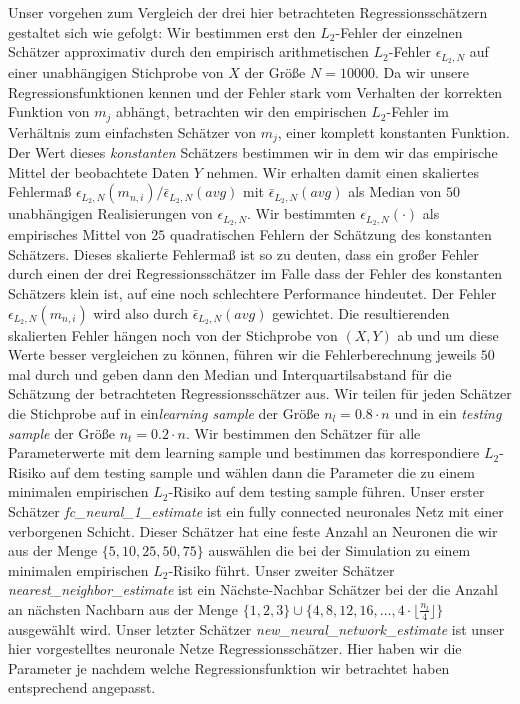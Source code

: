 Unser vorgehen zum Vergleich der drei hier betrachteten Regressionsschätzern gestaltet sich wie gefolgt:
Wir bestimmen erst den $L_2$-Fehler der einzelnen Schätzer approximativ durch den empirisch arithmetischen $L_2$-Fehler $\epsilon_{L_2,N}$ auf einer unabhängigen Stichprobe von $X$ der Größe $N = 10000$. Da wir unsere Regressionsfunktionen kennen und der Fehler stark vom Verhalten der korrekten Funktion von $m_j$ abhängt, betrachten wir den empirischen $L_2$-Fehler im Verhältnis zum einfachsten Schätzer von $m_j$, einer komplett konstanten Funktion. Der Wert dieses \textit{konstanten} Schätzers bestimmen wir in dem wir das empirische Mittel der beobachtete Daten $Y$ nehmen. Wir erhalten damit einen skaliertes Fehlermaß $\epsilon_{L_2,N}(m_{n,i})/\bar{\epsilon}_{L_2,N}(avg)$ mit $\bar{\epsilon}_{L_2,N}(avg)$ als Median von $50$ unabhängigen Realisierungen von $\epsilon_{L_2,N}$. Wir bestimmten $\epsilon_{L_2,N}(\cdot)$ als empirisches Mittel von $25$ quadratischen Fehlern der Schätzung des konstanten Schätzers. Dieses skalierte Fehlermaß ist so zu deuten, dass ein großer Fehler durch einen der drei Regressionsschätzer im Falle dass der Fehler des konstanten Schätzers klein ist, auf eine noch schlechtere Performance hindeutet. Der Fehler $\epsilon_{L_2,N}(m_{n,i})$ wird also durch $\bar{\epsilon}_{L_2,N}(avg)$ gewichtet.
Die resultierenden skalierten Fehler hängen noch von der Stichprobe von $(X, Y)$ ab und um diese Werte besser vergleichen zu können, führen wir die Fehlerberechnung jeweils $50$ mal durch und geben dann den Median und Interquartilsabstand für die Schätzung der betrachteten Regressionsschätzer aus.
Wir teilen für jeden Schätzer die Stichprobe auf in ein\textit{learning sample} der Größe $n_l = 0.8 \cdot n$ und in ein \textit{testing sample} der Größe $n_t = 0.2 \cdot n$. Wir bestimmen den Schätzer für alle Parameterwerte mit dem learning sample und bestimmen das korrespondiere $L_2$-Risiko auf dem testing sample und wählen dann die Parameter die zu einem minimalen empirischen $L_2$-Risiko auf dem testing sample führen.
Unser erster Schätzer \textit{fc\_neural\_1\_estimate} ist ein fully connected neuronales Netz mit einer verborgenen Schicht. Dieser Schätzer hat eine feste Anzahl an Neuronen die wir aus der Menge $\{5, 10, 25, 50, 75\}$ auswählen die bei der Simulation zu einem minimalen empirischen $L_2$-Risiko führt.
Unser zweiter Schätzer \textit{nearest\_neighbor\_estimate} ist ein Nächste-Nachbar Schätzer bei der die Anzahl an nächsten Nachbarn aus der Menge $\{1, 2, 3\} \cup \{4, 8, 12, 16, \dots, 4 \cdot \lfloor\frac{n_l}{4}\rfloor\}$ ausgewählt wird.
Unser letzter Schätzer \textit{new\_neural\_network\_estimate} ist unser hier vorgestelltes neuronale Netze Regressionsschätzer. Hier haben wir die Parameter je nachdem welche Regressionsfunktion wir betrachtet haben entsprechend angepasst.

